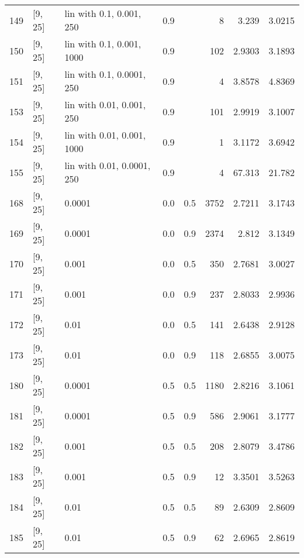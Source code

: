 \begin{longtable}{lllrrrrr}
  149 &            [9, 25] &    lin with 0.1, 0.001, 250 &      0.9 &     &    8 &    3.239 &   3.0215 \\
  150 &            [9, 25] &   lin with 0.1, 0.001, 1000 &      0.9 &     &  102 &   2.9303 &   3.1893 \\
  151 &            [9, 25] &   lin with 0.1, 0.0001, 250 &      0.9 &     &    4 &   3.8578 &   4.8369 \\
  153 &            [9, 25] &   lin with 0.01, 0.001, 250 &      0.9 &     &  101 &   2.9919 &   3.1007 \\
  154 &            [9, 25] &  lin with 0.01, 0.001, 1000 &      0.9 &     &    1 &   3.1172 &   3.6942 \\
  155 &            [9, 25] &  lin with 0.01, 0.0001, 250 &      0.9 &     &    4 &   67.313 &   21.782 \\
  168 &            [9, 25] &                      0.0001 &      0.0 & 0.5 & 3752 &   2.7211 &   3.1743 \\
  169 &            [9, 25] &                      0.0001 &      0.0 & 0.9 & 2374 &    2.812 &   3.1349 \\
  170 &            [9, 25] &                       0.001 &      0.0 & 0.5 &  350 &   2.7681 &   3.0027 \\
  171 &            [9, 25] &                       0.001 &      0.0 & 0.9 &  237 &   2.8033 &   2.9936 \\
  172 &            [9, 25] &                        0.01 &      0.0 & 0.5 &  141 &   2.6438 &   2.9128 \\
  173 &            [9, 25] &                        0.01 &      0.0 & 0.9 &  118 &   2.6855 &   3.0075 \\
  180 &            [9, 25] &                      0.0001 &      0.5 & 0.5 & 1180 &   2.8216 &   3.1061 \\
  181 &            [9, 25] &                      0.0001 &      0.5 & 0.9 &  586 &   2.9061 &   3.1777 \\
  182 &            [9, 25] &                       0.001 &      0.5 & 0.5 &  208 &   2.8079 &   3.4786 \\
  183 &            [9, 25] &                       0.001 &      0.5 & 0.9 &   12 &   3.3501 &   3.5263 \\
  184 &            [9, 25] &                        0.01 &      0.5 & 0.5 &   89 &   2.6309 &   2.8609 \\
  185 &            [9, 25] &                        0.01 &      0.5 & 0.9 &   62 &   2.6965 &   2.8619 \\

\end{longtable}
